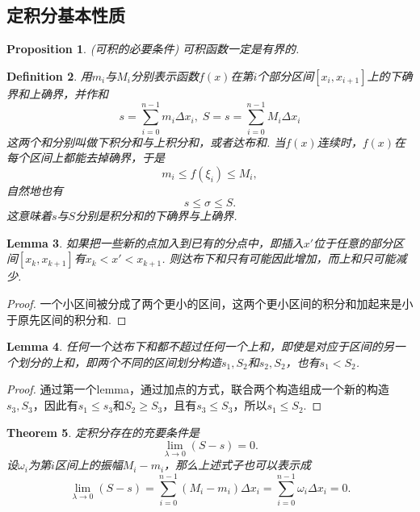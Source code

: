 \documentclass{article}
\newtheorem{theorem}{Theorem}[section]
\newtheorem{lemma}[theorem]{Lemma}
\newtheorem{proposition}[theorem]{Proposition}
\newtheorem{definition}[theorem]{Definition}
\begin{document}
\subsection{定积分基本性质}

\begin{proposition}
\rm {\color{red} (可积的必要条件)} 可积函数一定是有界的.
\end{proposition}

\begin{definition}
\rm 用$m_i$与$M_i$分别表示函数$f(x)$在第$i$个部分区间$[x_i,x_{i+1}]$上的下确界和上确界，并作和
$$
s = \sum\limits_{i=0}^{n-1}m_i\Delta x_i,\; S = s = \sum\limits_{i=0}^{n-1}M_i\Delta x_i
$$
这两个和分别叫做{\color{red}下积分}和与{\color{red}上积分和}，或者{\color{red}达布和}. 当$f(x)$连续时，$f(x)$在每个区间上都能去掉确界，于是
$$
m_i \leq f(\xi_i) \leq M_i,
$$ 
自然地也有
$$
s \leq \sigma \leq S.
$$
这意味着$s$与$S$分别是积分和的下确界与上确界.
\end{definition}


\begin{lemma}
\rm 如果把一些新的点加入到已有的分点中，即插入$x'$位于任意的部分区间$[x_k,x_{k+1}]$有$x_k < x' < x_{k+1}$. 则达布下和只有可能因此增加，而上和只可能减少.
\end{lemma}

\begin{proof}
一个小区间被分成了两个更小的区间，这两个更小区间的积分和加起来是小于原先区间的积分和.
\end{proof}

\begin{lemma}
\rm 任何一个达布下和都不超过任何一个上和，即使是对应于区间的另一个划分的上和，即两个不同的区间划分构造$s_1,S_2$和$s_2,S_2$，也有$s_1 < S_2$.
\end{lemma}

\begin{proof}
通过第一个lemma，通过加点的方式，联合两个构造组成一个新的构造$s_3,S_3$，因此有$s_1 \leq s_3$和$S_2 \geq S_3$，且有$s_3 \leq S_3$，所以$s_1 \leq S_2$.
\end{proof}

\begin{theorem}
\rm {\color{red}定积分存在的充要条件}是
$$
\lim\limits_{\lambda \rightarrow 0} (S-s) = 0.
$$
设$\omega_i$为第$i$区间上的{\color{red}振幅}$M_i - m_i$，那么上述式子也可以表示成
$$
\lim\limits_{\lambda \rightarrow 0} (S-s) = \sum\limits_{i=0}^{n-1} (M_i-m_i) \Delta x_i = \sum\limits_{i=0}^{n-1} \omega_i \Delta x_i = 0.
$$
\end{theorem}
\end{document}
